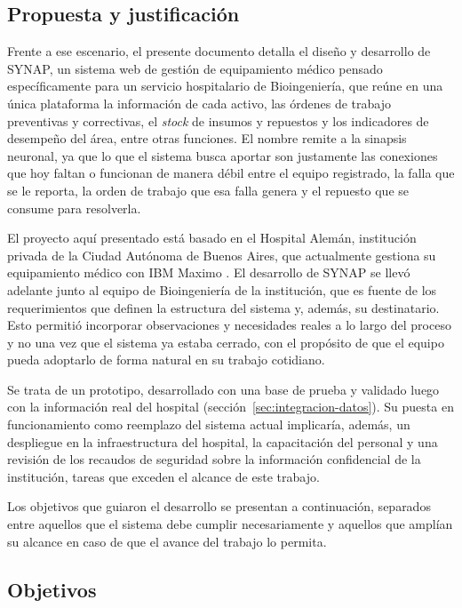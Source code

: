 \documentclass[10pt]{article}
\begin{document}
\subsection{Propuesta y justificación}
\label{sec:propuesta-justificacion}
Frente a ese escenario, el presente documento detalla el diseño y desarrollo de SYNAP, un sistema web de gestión de equipamiento médico pensado específicamente para un servicio hospitalario de Bioingeniería, que reúne en una única plataforma la información de cada activo, las órdenes de trabajo preventivas y correctivas, el \textit{stock} de insumos y repuestos y los indicadores de desempeño del área, entre otras funciones. El nombre remite a la sinapsis neuronal, ya que lo que el sistema busca aportar son justamente las conexiones que hoy faltan o funcionan de manera débil entre el equipo registrado, la falla que se le reporta, la orden de trabajo que esa falla genera y el repuesto que se consume para resolverla.

El proyecto aquí presentado está basado en el Hospital Alemán, institución privada de la Ciudad Autónoma de Buenos Aires, que actualmente gestiona su equipamiento médico con IBM Maximo \cite{ibm_maximo}. El desarrollo de SYNAP se llevó adelante junto al equipo de Bioingeniería de la institución, que es fuente de los requerimientos que definen la estructura del sistema y, además, su destinatario. Esto permitió incorporar observaciones y necesidades reales a lo largo del proceso y no una vez que el sistema ya estaba cerrado, con el propósito de que el equipo pueda adoptarlo de forma natural en su trabajo cotidiano.

Se trata de un prototipo, desarrollado con una base de prueba y validado luego con la información real del hospital (sección~\ref{sec:integracion-datos}). Su puesta en funcionamiento como reemplazo del sistema actual implicaría, además, un despliegue en la infraestructura del hospital, la capacitación del personal y una revisión de los recaudos de seguridad sobre la información confidencial de la institución, tareas que exceden el alcance de este trabajo.

Los objetivos que guiaron el desarrollo se presentan a continuación, separados entre aquellos que el sistema debe cumplir necesariamente y aquellos que amplían su alcance en caso de que el avance del trabajo lo permita.

\subsection{Objetivos}
\label{sec:objetivos}
\end{document}
